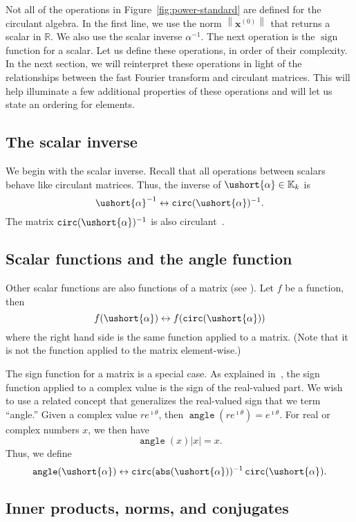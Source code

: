 \documentclass[1p,authoryear,letterpaper]{elsarticle}
\renewcommand{\cite}{\citep}
\DeclareMathOperator{\tcirc}{\texttt{circ}}
\DeclareMathOperator{\tabs}{\texttt{abs}}
\providecommand{\ii}{\imath}
\providecommand{\RR}{\mathbb{R}}
\providecommand{\KK}{\mathbb{K}}
\providecommand{\normof}[2][]{\left\| #2 \right\|_{#1}}\providecommand{\nnormof}[2][]{\| #2 \|_{#1}}\providecommand{\itr}[2]{#1^{(#2)}}
\providecommand{\itn}[1]{^{(#1)}}\providecommand{\cardof}[1]{\left| #1 \right|}
\providecommand{\absof}[1]{\left| #1 \right|}
\DeclareMathOperator{\sign}{sign}
\renewcommand{\vec}{\mathbf}
\providecommand{\vx}{\ensuremath{\vec{x}}}
\renewcommand{\circeq}{\leftrightarrow}
\newcommand{\cel}[1]{\ushort{#1}}
\newcommand{\calpha}{\ensuremath{\cel{\alpha}}}
\DeclareMathOperator{\tangle}{\texttt{angle}}
\begin{document}
Not all of the operations in Figure~\ref{fig:power-standard} are defined for the
circulant algebra.  In the
first line, we use the norm $\normof{\vx\itn{0}}$ that returns
a scalar in $\RR$.  We also use the scalar inverse $\alpha^{-1}$.
The next operation is the $\sign$ function for a scalar.
Let us define these operations, in order of
their complexity.  In the next section, we will reinterpret
these operations in light of the relationships between
the fast Fourier transform and circulant matrices.
This will help illuminate a few additional properties
of these operations and will let us state an ordering for elements.

\subsection{The scalar inverse}
We begin with the scalar inverse.  Recall that
all operations between scalars behave like circulant
matrices.  Thus, the inverse of $\calpha \in \KK_k$ is
\[ \calpha^{-1} \circeq \tcirc(\calpha)^{-1}. \]
The matrix $\tcirc(\calpha)^{-1}$ is also
circulant~\cite{davis1979-circulant}.

\subsection{Scalar functions and the angle function}
Other scalar functions are also functions of a
matrix (see
\citet{Higham2008-functions-of-matrices}).
Let $f$
be a function, then
\[ f(\calpha) \circeq f(\tcirc(\calpha)) \]
where the right hand side is the same function
applied to a matrix.  (Note that it is not the function applied
to the matrix element-wise.)  



The sign function for a matrix is a special case.
As explained in~\citet{Higham2008-functions-of-matrices},
the sign function applied to a complex value is
the sign of the real-valued part.  We wish to use
a related concept that generalizes the real-valued
sign that we term ``angle.''  Given a complex value
$r e^{\ii \theta}$, then
$\tangle(r e^{\ii \theta}) = e^{\ii \theta}$.
For real or complex numbers $x$, we then have
\[ \tangle(x) \absof{x} = x. \]
Thus, we define
\[ \tangle(\calpha) \circeq \tcirc(\tabs(\calpha))^{-1} \tcirc(\calpha). \]



\subsection{Inner products, norms, and conjugates}
\label{sec:norm}
\end{document}
